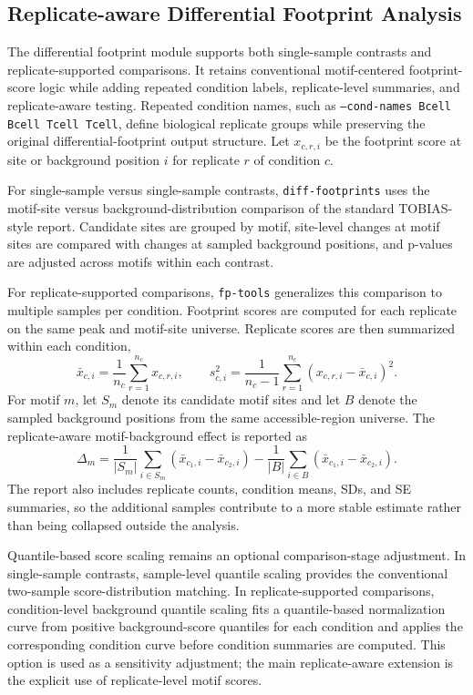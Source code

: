 \documentclass[biomedinformatics,article,submit,pdftex,moreauthors]{Definitions/mdpi}
\begin{document}
\subsection{Replicate-aware Differential Footprint Analysis}
\label{sec:replicate}

The differential footprint module supports both single-sample contrasts and
replicate-supported comparisons. It retains conventional motif-centered
footprint-score logic while adding repeated condition labels, replicate-level
summaries, and replicate-aware testing.
Repeated condition names, such as \texttt{--cond-names Bcell Bcell Tcell
Tcell}, define biological replicate groups while preserving the original
differential-footprint output structure. Let $x_{c,r,i}$ be the footprint score
at site or background position $i$ for replicate $r$ of condition $c$.

For single-sample versus single-sample contrasts, \texttt{diff-footprints} uses
the motif-site versus background-distribution comparison of the standard
TOBIAS-style report. Candidate sites are grouped by motif, site-level changes at
motif sites are compared with changes at sampled background positions, and
p-values are adjusted across motifs within each contrast.

For replicate-supported comparisons, \texttt{fp-tools} generalizes this
comparison to multiple samples per condition. Footprint scores are computed for
each replicate on the same peak and motif-site universe. Replicate scores are
then summarized within each condition,
\[
\bar{x}_{c,i}=\frac{1}{n_c}\sum_{r=1}^{n_c}x_{c,r,i},
\qquad
s^2_{c,i}=\frac{1}{n_c-1}\sum_{r=1}^{n_c}(x_{c,r,i}-\bar{x}_{c,i})^2 .
\]
For motif $m$, let $S_m$ denote its candidate motif sites and let $B$ denote the
sampled background positions from the same accessible-region universe. The
replicate-aware motif-background effect is reported as
\[
\Delta_m =
\frac{1}{|S_m|}\sum_{i\in S_m}(\bar{x}_{c_1,i}-\bar{x}_{c_2,i})
-
\frac{1}{|B|}\sum_{i\in B}(\bar{x}_{c_1,i}-\bar{x}_{c_2,i}) .
\]
The report also includes replicate counts, condition means, SDs, and SE
summaries, so the additional samples contribute to a more stable estimate rather
than being collapsed outside the analysis.

Quantile-based score scaling remains an optional comparison-stage adjustment. In
single-sample contrasts, sample-level quantile scaling provides the conventional
two-sample score-distribution matching. In replicate-supported comparisons,
condition-level background quantile scaling fits a quantile-based normalization
curve from positive background-score quantiles for each condition and applies the
corresponding condition curve before condition summaries are computed. This
option is used as a sensitivity adjustment; the main replicate-aware extension is
the explicit use of replicate-level motif scores.
\end{document}
